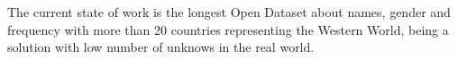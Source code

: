 \documentclass[a4paper]{article}
\begin{document}
The current state of work is the longest Open Dataset about names,
gender and frequency with more than 20 countries representing the
Western World, being a solution with low number of unknows in the real
world.




 

\end{document}

